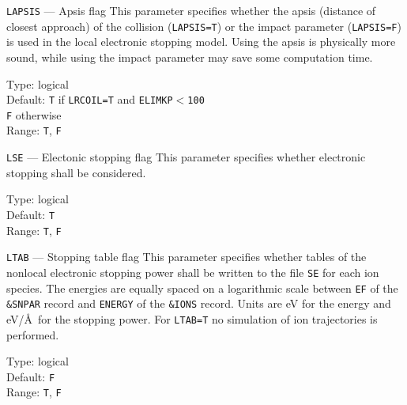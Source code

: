\begin{keydescription}{\texttt{LAPSIS} --- Apsis flag}
%
  This parameter specifies whether the apsis (distance of closest
  approach) of the collision (\texttt{LAPSIS=T}) or the impact
  parameter (\texttt{LAPSIS=F}) is used in the local electronic
  stopping model. Using the apsis is physically more sound, while using the
  impact parameter may save some computation time.
  \begin{keytab}
    Type:    \> logical \\
    Default: \> \texttt{T} if \texttt{LRCOIL=T} and \texttt{ELIMKP$<$100} \\
             \> \texttt{F} otherwise \\
    Range:   \> \texttt{T}, \texttt{F}
  \end{keytab}
\end{keydescription}

\begin{keydescription}{\texttt{LSE} --- Electonic stopping flag}
%
  This parameter specifies whether electronic stopping shall be
  considered. 
  \begin{keytab}
    Type:    \> logical \\
    Default: \> \texttt{T} \\
    Range:   \> \texttt{T}, \texttt{F}
  \end{keytab}
\end{keydescription}

\begin{keydescription}{\texttt{LTAB} --- Stopping table flag}
%
  This parameter specifies whether tables of the nonlocal electronic
  stopping power shall be written to the file \texttt{SE} for each ion species. 
  The energies are equally spaced on a logarithmic
  scale between \texttt{EF} of the \texttt{\&SNPAR} record and
  \texttt{ENERGY} of the \texttt{\&IONS} record.  Units are eV for the
  energy and eV/\AA\ for the stopping power.  For \texttt{LTAB=T} no
  simulation of ion trajectories is performed.
  \begin{keytab}
    Type:    \> logical \\
    Default: \> \texttt{F} \\
    Range:   \> \texttt{T}, \texttt{F}
  \end{keytab}
\end{keydescription}

